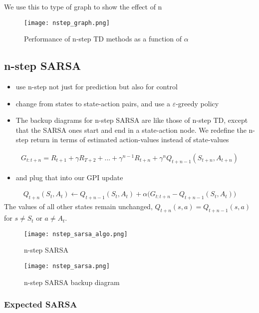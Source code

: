 \documentclass[sutton_barto_notes.tex]{subfiles}
\begin{document}
We use this to type of graph to show the effect of n

\begin{figure}[h!]
    \centering
     \texttt{[image: nstep\_graph.png]}
    \caption{ Performance of n-step TD methods as a function of $\alpha$ }
\end{figure}

\newpage
\subsection{n-step SARSA}

\begin{itemize}
\item use n-step not just for prediction but also for control
\item change from states to state-action pairs, and use a $\varepsilon$-greedy policy
\item The backup diagrams for n-step SARSA are like those of n-step TD, except that the SARSA ones start and end in a state-action node.
We redefine the n-step return in terms of estimated action-values instead of state-values
\end{itemize}
\begin{align}
G_{t:t+n} = R_{t+1} + \gamma R_{T+2} + ... + \gamma^{n-1} R_{t+n} + \gamma^n Q_{t+n-1}(S_{t+n}, A_{t+n}) \label{eq:7.6}\tag{7.6}
\end{align}
\begin{itemize}
\item and plug that into our GPI update
\end{itemize}
\begin{align}
Q_{t+n}(S_t, A_t) \gets Q_{t+n-1}(S_t, A_t)  + \alpha \big(G_{t:t+n} - Q_{t+n-1}(S_t, A_t)\big) \label{eq:7.7}\tag{7.7}
\end{align}
The values of all other states remain unchanged, $Q_{t+n}(s,a) = Q_{t+n-1}(s,a)$ for $s \neq S_t$ or $a \neq A_t$.

\begin{figure}[h!]
    \centering
     \texttt{[image: nstep\_sarsa\_algo.png]}
    \caption{ n-step SARSA }
\end{figure}
\begin{figure}[h!]
    \centering
     \texttt{[image: nstep\_sarsa.png]}
    \caption{ n-step SARSA backup diagram }
\end{figure}

\subsubsection{Expected SARSA}
\end{document}
